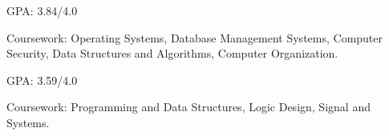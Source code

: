 \newcommand{\TUBentry}{
    \TUB
    \poswithprd{Introduction to 3D Scanning and Printing at TUB Winter University}{Jan 2018-Feb 2018}
    \begin{itemize}
        \item 
        Learned the basic of 3D scanning \& printing. Learned Blender for 3D modeling.
    \end{itemize}
}



\UM
{}
\begin{miniItemize}
    \item GPA: 3.84/4.0
    \item Coursework: 
        Operating Systems,
        Database Management Systems,
        Computer Security,
        Data Structures and Algorithms,
        Computer Organization.
\end{miniItemize}

\JI
{}
\begin{miniItemize}
    \item GPA: 3.59/4.0
    \item Coursework:
        Programming and Data Structures,
        Logic Design,
        Signal and Systems.
\end{miniItemize}

